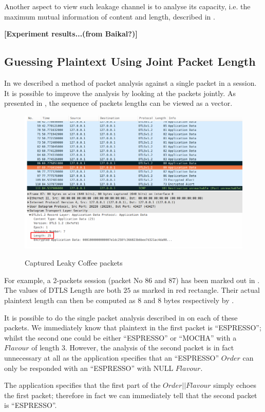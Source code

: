 Another aspect to view such leakage channel is to analyse its capacity, i.e. the maximum mutual information of content and length, described in \cite{Web2}.

\textbf{[Experiment results...(from Baikal?)]}

\subsection{Guessing Plaintext Using Joint Packet Length}
 In  we described a method of packet analysis against a single packet in a session. It is possible to improve the analysis by looking at the packets jointly. As presented in \cite{Web2}, the sequence of packets lengths can be viewed as a vector.

\begin{example}
\begin{figure}[H] 
\centering
\resizebox{14cm}{!}
{\includegraphics{./Pics/Wireshark01.png}}
\caption{Captured Leaky Coffee packets}
\label{Fig: Captured Packets 01}
\end{figure}

For example, a 2-packets session (packet No 86 and 87) has been marked out in . The values of DTLS Length  are both $25$ as marked in red rectangle. Their actual plaintext length can then be computed as $8$ and $8$ bytes respectively by . 

It is possible to do the single packet analysis described in  on each of these packets. We immediately know that plaintext in the first packet is “ESPRESSO”; whilst the second one could be either “ESPRESSO” or “MOCHA” with a $Flavour$ of length $3$. However, the analysis of the second packet is in fact unnecessary at all as the application specifies that an “ESPRESSO” $Order$ can only be responded with an “ESPRESSO” with NULL $Flavour$.

The application specifies that the first part of the $Order||Flavour$ simply echoes the first packet; therefore in fact we can immediately tell that the second packet is “ESPRESSO”.
\end{example}

